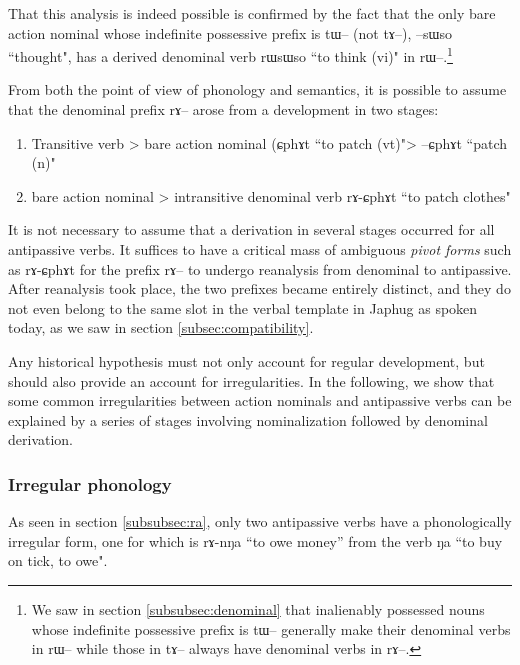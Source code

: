 \documentclass[oldfontcommands,oneside,a4paper,11pt]{article}
\newcommand{\ipa}[1]{{\phon \mbox{#1}}} %
\begin{document}
That this analysis is indeed possible is confirmed by the fact that the only bare action nominal whose indefinite possessive prefix is  \ipa{tɯ--} (not \ipa{tɤ--}), \ipa{--sɯso} ``thought", has a derived denominal verb \ipa{rɯsɯso} ``to think (vi)" in \ipa{rɯ}--.\footnote{We saw in section \ref{subsubsec:denominal} that inalienably possessed nouns whose indefinite possessive prefix is \ipa{tɯ}-- generally make their denominal verbs in \ipa{rɯ}-- while those in \ipa{tɤ}-- always have denominal verbs in \ipa{rɤ}--.}

From both the point of view of phonology and semantics, it is possible to assume that the denominal prefix \ipa{rɤ}-- arose from a development in two stages:
\begin{enumerate}
\item Transitive verb > bare action nominal (\ipa{ɕphɤt} ``to patch (vt)"> \ipa{--ɕphɤt} ``patch (n)"
\item bare action nominal > intransitive denominal verb \ipa{rɤ-ɕphɤt} ``to patch clothes"
\end{enumerate}

It is not necessary to assume that a derivation in several stages occurred for all antipassive verbs. It suffices to have a critical mass of ambiguous \textit{pivot forms} such as \ipa{rɤ-ɕphɤt} for the prefix \ipa{rɤ}-- to undergo reanalysis from denominal to antipassive.   After reanalysis took place, the two prefixes became entirely distinct, and they do not  even belong to the same slot in the verbal template in   Japhug as spoken today, as we saw in section \ref{subsec:compatibility}.



Any historical hypothesis must not only account for regular development, but should also provide an account for irregularities. In the following, we show that  some common irregularities between action nominals and antipassive verbs can be explained by a series of stages involving nominalization followed by denominal derivation.


\subsubsection{Irregular phonology} \label{subsec:phono.irr}
As seen in section \ref{subsubsec:ra}, only two antipassive verbs have a phonologically irregular form, one for which is \ipa{rɤ-nŋa} ``to owe money'' from the verb \ipa{ŋa} ``to buy on tick, to owe".
\end{document}
